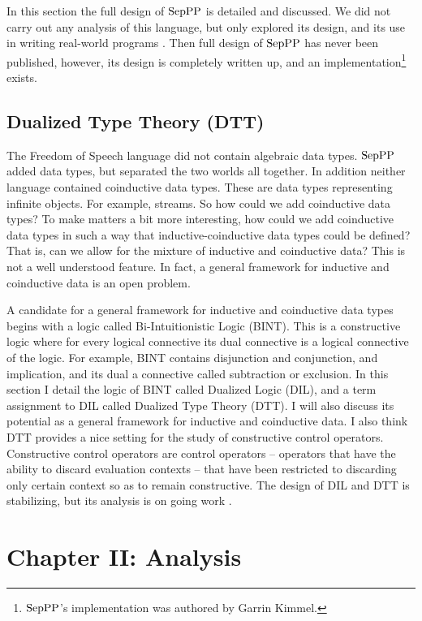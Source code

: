 In this section the full design of $\text{SepPP}$ is detailed and discussed.
We did not carry out any analysis of this language, but only explored
its design, and its use in writing real-world programs
\cite{Kimmel:2013,Kimmel:2012}.  Then full design of $\text{SepPP}$ has never
been published, however, its design is completely written up, and
an implementation\footnote{$\text{SepPP}$'s implementation was authored by
  Garrin Kimmel.}  exists.

\subsection{Dualized Type Theory (DTT)}
\label{subsec:dualized_type_theory}
The Freedom of Speech language did not contain algebraic data types.
$\text{SepPP}$ added data types, but separated the two worlds all together.
In addition neither language contained coinductive data types.  These
are data types representing infinite objects.  For example, streams.
So how could we add coinductive data types?  To make matters a bit
more interesting, how could we add coinductive data types in such a
way that inductive-coinductive data types could be defined?  That is,
can we allow for the mixture of inductive and coinductive data?  This
is not a well understood feature.  In fact, a general framework for
inductive and coinductive data is an open problem.    

A candidate for a general framework for inductive and coinductive data
types begins with a logic called Bi-Intuitionistic Logic (BINT). This
is a constructive logic where for every logical connective its dual
connective is a logical connective of the logic.  For example, BINT
contains disjunction and conjunction, and implication, and its dual a
connective called subtraction or exclusion.  In this section I detail
the logic of BINT called Dualized Logic (DIL), and a term assignment
to DIL called Dualized Type Theory (DTT).  I will also discuss its
potential as a general framework for inductive and coinductive data.
I also think DTT provides a nice setting for the study of constructive
control operators. Constructive control operators are control
operators -- operators that have the ability to discard evaluation
contexts -- that have been restricted to discarding only certain
context so as to remain constructive.  The design of DIL and DTT is
stabilizing, but its analysis is on going work \cite{Stump:2013}.

\section{Chapter II: Analysis}
\label{sec:analysis}

